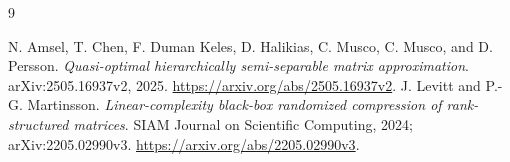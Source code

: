 \documentclass[11pt,oneside,openany,a4paper]{report}
\numberwithin{equation}{chapter}
\theoremstyle{definition}
\theoremstyle{remark}
\begin{document}
\begin{thebibliography}{9}
N. Amsel, T. Chen, F. Duman Keles, D. Halikias, C. Musco, C. Musco, and D. Persson.
\emph{Quasi-optimal hierarchically semi-separable matrix approximation}.
arXiv:2505.16937v2, 2025.
\url{https://arxiv.org/abs/2505.16937v2}.
J. Levitt and P.-G. Martinsson.
\emph{Linear-complexity black-box randomized compression of rank-structured matrices}.
SIAM Journal on Scientific Computing, 2024; arXiv:2205.02990v3.
\url{https://arxiv.org/abs/2205.02990v3}.
\end{thebibliography}
\end{document}
